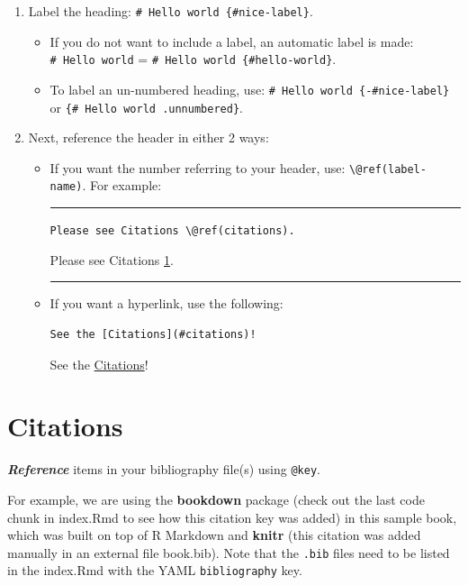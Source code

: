 \documentclass[
]{book}
\providecommand{\tightlist}{%
  \setlength{\itemsep}{0pt}\setlength{\parskip}{0pt}}
\theoremstyle{definition}
\theoremstyle{definition}
\theoremstyle{definition}
\theoremstyle{definition}
\theoremstyle{remark}
\begin{document}
\begin{enumerate}
\def\labelenumi{\arabic{enumi}.}
\tightlist
\item
  Label the heading: \texttt{\#\ Hello\ world\ \{\#nice-label\}}.

  \begin{itemize}
  \tightlist
  \item
    If you do not want to include a label, an automatic label is made: \texttt{\#\ Hello\ world} = \texttt{\#\ Hello\ world\ \{\#hello-world\}}.
  \item
    To label an un-numbered heading, use: \texttt{\#\ Hello\ world\ \{-\#nice-label\}} or \texttt{\{\#\ Hello\ world\ .unnumbered\}}.
  \end{itemize}
\item
  Next, reference the header in either 2 ways:

  \begin{itemize}
  \item
    If you want the number referring to your header, use: \texttt{\textbackslash{}@ref(label-name)}. For example:

    \begin{center}\rule{0.5\linewidth}{0.5pt}\end{center}

    \texttt{Please\ see\ Citations\ \textbackslash{}@ref(citations).}

    Please see Citations \ref{citations}.

    \begin{center}\rule{0.5\linewidth}{0.5pt}\end{center}
  \item
    If you want a hyperlink, use the following:

\begin{verbatim}
See the [Citations](#citations)!
\end{verbatim}

    See the \hyperref[citations]{Citations}!
  \end{itemize}
\end{enumerate}

\section{Citations}\label{citations}

\textbf{\emph{Reference}} items in your bibliography file(s) using \texttt{@key}.

For example, we are using the \textbf{bookdown} package \citep{R-bookdown} (check out the last code chunk in index.Rmd to see how this citation key was added) in this sample book, which was built on top of R Markdown and \textbf{knitr} \citep{xie2015} (this citation was added manually in an external file book.bib). Note that the \texttt{.bib} files need to be listed in the index.Rmd with the YAML \texttt{bibliography} key.
\end{document}
